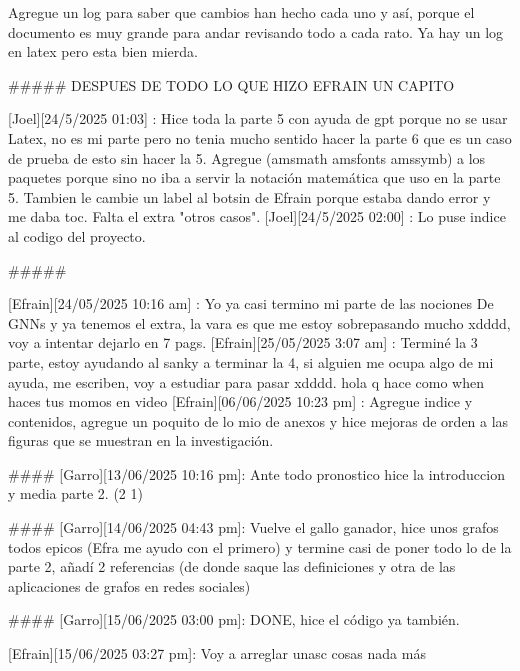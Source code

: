 Agregue un log para saber que cambios han hecho cada uno y así, porque el documento es muy grande para andar revisando todo a cada rato. Ya hay un log en latex pero esta bien mierda.

#####
DESPUES DE TODO LO QUE HIZO EFRAIN UN CAPITO

[Joel][24/5/2025 01:03] : Hice toda la parte 5 con ayuda de gpt porque no se usar Latex, no es mi parte pero no tenia mucho sentido hacer la parte 6 que es un caso de prueba de esto sin hacer la 5. Agregue ({amsmath} {amsfonts} {amssymb}) a los paquetes porque sino no iba a servir la notación matemática que uso en la parte 5. Tambien le cambie un label al botsin de Efrain porque estaba dando error y me daba toc. Falta el extra "otros casos".
[Joel][24/5/2025 02:00] : Lo puse indice al codigo del proyecto.

#####

[Efrain][24/05/2025 10:16 am] : Yo ya casi termino mi parte de las nociones De GNNs y ya tenemos el extra, la vara es que me estoy sobrepasando mucho xdddd, voy a intentar dejarlo en 7 pags.
[Efrain][25/05/2025 3:07 am] : Terminé la 3 parte, estoy ayudando al sanky a terminar la 4, si alguien me ocupa algo de mi ayuda, me escriben, voy a estudiar para pasar xdddd.
hola q hace
como when haces tus momos en video
[Efrain][06/06/2025 10:23 pm] : Agregue indice y contenidos, agregue un poquito de lo mio de anexos y hice mejoras de orden a las figuras que se muestran en la investigación.

####
[Garro][13/06/2025 10:16 pm]: Ante todo pronostico hice la introduccion y media parte 2. (2 1)

####
[Garro][14/06/2025 04:43 pm]: Vuelve el gallo ganador, hice unos grafos todos epicos (Efra me ayudo con el primero) y termine casi de poner todo lo de la parte 2, añadí 2 referencias (de donde saque las definiciones y otra de las aplicaciones de grafos en redes sociales)

####
[Garro][15/06/2025 03:00 pm]: DONE, hice el código ya también.

[Efrain][15/06/2025 03:27 pm]: Voy a arreglar unasc cosas nada más